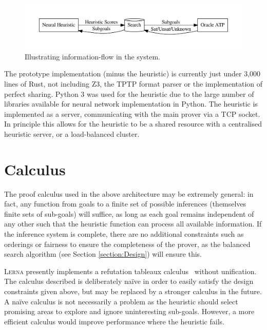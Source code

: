 \documentclass{llncs}
\newcommand{\lerna}{\textsc{Lerna}}
\newcommand{\z}[1]{\textsc{Z3}}
\begin{document}
\begin{figure}[t]
	\centering
	\includegraphics[width=0.8\linewidth]{architecture}
	\caption{Illustrating information-flow in the system.}
	\label{figure:architecture}
\end{figure}


The prototype implementation (minus the heuristic) %
is currently just under 3,000 lines of Rust, not including \z3{}, the TPTP format parser or the implementation of perfect sharing.
Python 3 was used for the heuristic due to the large number of libraries available for neural network implementation in Python.
The heuristic is implemented as a server, communicating with the main prover via a TCP socket.
In principle this allows for the heuristic to be a shared resource with a centralised heuristic server, or a load-balanced cluster.

\section{Calculus}
\label{section:Calculus}
The proof calculus used in the above architecture may be extremely general: in fact, any function from goals to a finite set of possible inferences (themselves finite sets of sub-goals) will suffice, as long as each goal remains independent of any other such that the heuristic function can process all available information.  If the inference system is complete, there are no additional constraints such as orderings or fairness to ensure the completeness of the prover, as the balanced search algorithm (see Section \ref{section:Design}) will ensure this.

\lerna{} presently implements a refutation tableaux calculus~\cite{handbook-of-automated-reasoning} without unification.
The calculus described is deliberately na\"ive in order to easily satisfy the design constraints given above, but may be replaced by a stronger calculus in the future. 
A na\"ive calculus is not necessarily a problem as the heuristic should select promising areas to explore and ignore uninteresting sub-goals.
However, a more efficient calculus would improve performance where the heuristic fails.
\end{document}
